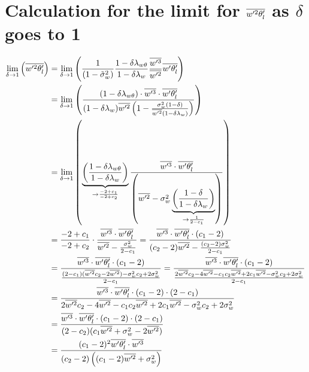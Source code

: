 \section{Calculation for the limit for \texorpdfstring{$\overline{w'^2 \theta_l'}$}{wprime2thetalprimebar} as \texorpdfstring{$\delta$}{delta} goes to 1}
\label{sec:calculation-for-the-limit-for-wprime2thetalprimebar-as-delta-goes-to-1}

\begin{align}
    \label{eq:limit_wprime2thetalbar_delta_to_1_calc}
    \lim_{\delta \to 1}\left(\overline{w'^2 \theta_l'}\right)
    &= \lim_{\delta \to 1}\left(
    \frac{1}{\left( 1 - \tilde{\sigma}_w^2 \right)}
    \frac{1 - \delta \lambda_{w\theta}}{1-\delta \lambda_w}
    \frac{\overline{w'^3}}{\overline{w'^2}} \overline{w' \theta_l'}
    \right)
    \\
    &= \lim_{\delta \to 1}\left(
    \frac{(1 - \delta \lambda_{w\theta}) \cdot \overline{w'^3} \cdot \overline{w' \theta_l'}}
    {(1-\delta \lambda_w)\overline{w'^2} \left(1-\frac{\sigma_w^2 (1-\delta)}{\overline{w'^2} (1-\delta\lambda_w)}\right)}
    \right)
    \\
    &= \lim_{\delta \to 1}\left(
    \underbrace{\left(\frac{1 - \delta \lambda_{w\theta}}{1 - \delta\lambda_w}\right)}_{\to \frac{-2 + c_1}{-2 + c_2}}
    \frac{\overline{w'^3} \cdot \overline{w' \theta_l'}}
    {\left(\overline{w'^2} - \sigma_w^2 \underbrace{\left(\frac{1-\delta}{1-\delta\lambda_w}\right)}_{\to \frac{1}{2 - c_1}}\right)}
    \right)
    \\
    &= \frac{-2 + c_1}{-2 + c_2} \cdot
    \frac{\overline{w'^3} \cdot \overline{w' \theta_l'}}
    {\overline{w'^2} - \frac{\sigma_w^2}{2 - c_1}}
    = \frac{\overline{w'^3} \cdot \overline{w' \theta_l'} \cdot (c_1 - 2)}
    {(c_2 - 2)\overline{w'^2} - \frac{(c_2 - 2)\sigma_w^2}{2 - c_1}} \\
    &= \frac{\overline{w'^3} \cdot \overline{w' \theta_l'} \cdot (c_1 - 2)}
    {\frac{(2 - c_1) (\overline{w'^2} c_2 - 2\overline{w'^2}) - \sigma_w^2 c_2 + 2\sigma_w^2}{2 - c_1}}
    = \frac{\overline{w'^3} \cdot \overline{w' \theta_l'} \cdot (c_1 - 2)}
    {\frac{2\overline{w'^2} c_2 - 4\overline{w'^2} - c_1 c_2 \overline{w'^2} + 2 c_1 \overline{w'^2} - \sigma_w^2 c_2 + 2\sigma_w^2}{2 - c_1}} \\
    &= \frac{\overline{w'^3} \cdot \overline{w' \theta_l'} \cdot (c_1 - 2) \cdot (2 - c_1)}
    {2\overline{w'^2} c_2 - 4\overline{w'^2} - c_1 c_2 \overline{w'^2} + 2 c_1 \overline{w'^2} - \sigma_w^2 c_2 + 2\sigma_w^2} \\
    &= \frac{\overline{w'^3} \cdot \overline{w' \theta_l'} \cdot (c_1 - 2) \cdot (2 - c_1)}
    {(2 - c_2) (c_1\overline{w'^2} + \sigma_w^2 - 2\overline{w'^2})} \\
    &= \frac{(c_1 - 2)^2 \overline{w' \theta_l'} \cdot \overline{w'^3}}{(c_2 - 2)\left((c_1 - 2)\overline{w'^2} + \sigma_w^2\right)}
\end{align}